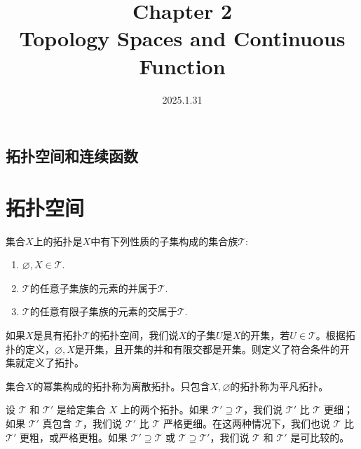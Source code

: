 \documentclass{article}
\title{\Huge \textbf{Chapter 2}\\
Topology Spaces and Continuous Function}
\date{2025.1.31}
\newcommand{\cT}{\mathcal{T}}
\begin{document}
\maketitle
\newpage

\begin{center}
\section*{拓扑空间和连续函数}
\end{center}

\section{拓扑空间}
\begin{definition}
    集合\(X\)上的拓扑是\(X\)中有下列性质的子集构成的集合族\(\mathcal{T}\):\begin{enumerate}[label=\arabic*.]
        \item \(\varnothing,X\in \cT\).
        \item \(\cT\)的任意子集族的元素的并属于\(\cT\).
        \item \(\cT\)的任意有限子集族的元素的交属于\(\cT\).
    \end{enumerate}
\end{definition}

如果\(X\)是具有拓扑\(\cT\)的拓扑空间，我们说\(X\)的子集\(U\)是\(X\)的开集，若\(U\in \cT\)。根据拓扑的定义，\(\varnothing,X\)是开集，且开集的并和有限交都是开集。则定义了符合条件的开集就定义了拓扑。

\begin{example}
    集合\(X\)的幂集构成的拓扑称为离散拓扑。只包含\(X,\varnothing\)的拓扑称为平凡拓扑。
\end{example}


\begin{definition}
设 $\mathcal{T}$ 和 $\mathcal{T}'$ 是给定集合 $X$ 上的两个拓扑。如果 $\mathcal{T}' \supseteq \mathcal{T}$，我们说 $\mathcal{T}'$ 比 $\mathcal{T}$ 更细；如果 $\mathcal{T}'$ 真包含 $\mathcal{T}$，我们说 $\mathcal{T}'$ 比 $\mathcal{T}$ 严格更细。在这两种情况下，我们也说 $\mathcal{T}$ 比 $\mathcal{T}'$ 更粗，或严格更粗。如果 $\mathcal{T}' \supseteq \mathcal{T}$ 或 $\mathcal{T} \supseteq \mathcal{T}'$，我们说 $\mathcal{T}$ 和 $\mathcal{T}'$ 是可比较的。
\end{definition}
\end{document}
